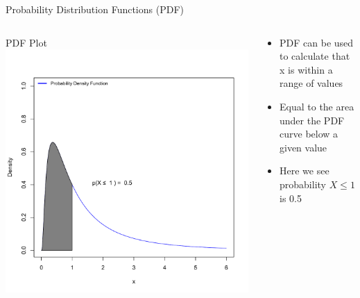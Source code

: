 \documentclass{beamer}
\begin{document}
\begin{frame}{Probability  Distribution Functions (PDF)}
\begin{columns}    
	\begin{column}{4cm}        
		\begin{center}
		PDF Plot           
	 	\includegraphics[width=1.0\textwidth]{Figure3}        
		\end{center}   
	 \end{column}    
	\begin{column}{5cm}        
	  
	\begin{itemize}
	\item PDF can be used to calculate that  x is within a range of values
	\item Equal to the area under the PDF curve below a given value
	\item Here we see probability $X \le 1$ is 0.5
	\end{itemize}
	\end{column}
	\end{columns}

\end{frame}
\end{document}
